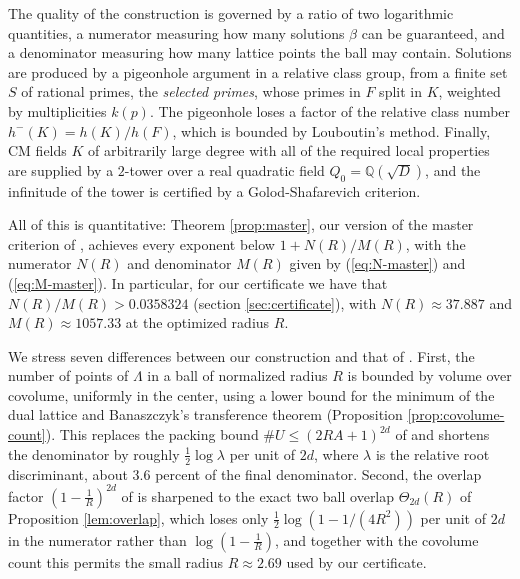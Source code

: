The quality of
the construction is governed by a ratio of two logarithmic quantities, a
numerator measuring how many solutions $\beta$ can be guaranteed, and a
denominator measuring how many lattice points the ball may contain.
Solutions are produced by a pigeonhole argument in a relative class
group, from a finite set $S$ of rational primes, the \emph{selected
primes}, whose primes in $F$ split in $K$, weighted by multiplicities
$k(p)$. The pigeonhole loses a factor of the relative class number
$h^{-}(K)=h(K)/h(F)$, which is bounded by Louboutin's method. Finally,
CM fields $K$ of arbitrarily large degree with all of the required local
properties are supplied by a $2$-tower over a real quadratic field
$Q_{0}=\mathbb{Q}(\sqrt{D})$, and the infinitude of the tower is
certified by a Golod-Shafarevich criterion.

All of this is quantitative: Theorem \ref{prop:master}, our version
of the master criterion of \cite[Proposition 10]{Sawin}, achieves
every exponent below $1+N(R)/M(R)$, with the numerator $N(R)$ and
denominator $M(R)$ given by (\ref{eq:N-master}) and (\ref{eq:M-master}).
In particular, for our certificate we have that $N(R)/M(R)>0.0358324$
(section \ref{sec:certificate}), with $N(R)\approx37.887$ and
$M(R)\approx1057.33$ at the optimized radius $R$.

We stress seven differences between our construction and that of
\cite{Sawin}. First, the number of points of $\Lambda$ in a ball of
normalized radius $R$ is bounded by volume over covolume, uniformly in
the center, using a lower bound for the minimum of the dual lattice and
Banaszczyk's transference theorem \cite{Banaszczyk} (Proposition
\ref{prop:covolume-count}). This replaces the packing bound
$\#U\leq(2RA+1)^{2d}$ of \cite[Lemma 2]{Sawin} and shortens the
denominator by roughly $\frac{1}{2}\log\lambda$ per unit of $2d$, where
$\lambda$ is the relative root discriminant, about $3.6$ percent of the
final denominator. Second, the overlap factor $(1-\frac{1}{R})^{2d}$ of
\cite[Lemma 2]{Sawin} is sharpened to the exact two ball overlap
$\Theta_{2d}(R)$ of Proposition \ref{lem:overlap}, which loses only
$\frac{1}{2}\log(1-1/(4R^{2}))$ per unit of $2d$ in the numerator
rather than $\log(1-\frac{1}{R})$, and together with the covolume count
this permits the small radius $R\approx2.69$ used by our certificate.

